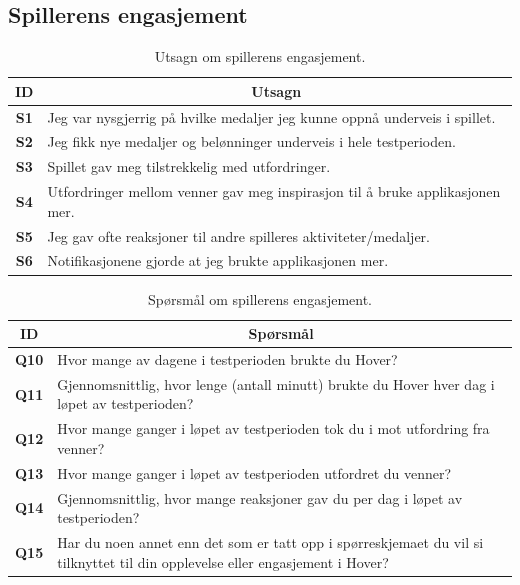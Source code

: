 \subsection*{Spillerens engasjement}
\begin{table}[H]
    \centering
    \begin{tabularx}{\textwidth}{|c|X|}
        \hline
        \textbf{ID} & \multicolumn{1}{c|}{\textbf{Utsagn}} \\ \hline
         \textbf{S1} & Jeg var nysgjerrig på hvilke medaljer jeg kunne oppnå underveis i spillet. \\ 
        \textbf{S2} & Jeg fikk nye medaljer og belønninger underveis i hele testperioden. \\ 
        \textbf{S3} & Spillet gav meg tilstrekkelig med utfordringer. \\ 
        \textbf{S4} & Utfordringer mellom venner gav meg inspirasjon til å bruke applikasjonen mer. \\ 
        \textbf{S5} & Jeg gav ofte reaksjoner til andre spilleres aktiviteter/medaljer. \\ 
        \textbf{S6} & Notifikasjonene gjorde at jeg brukte applikasjonen mer. \\
        \hline
    \end{tabularx}
    \caption{Utsagn om spillerens engasjement.}
    \label{tab:appendix_no_player_engagement_statements}
\end{table}

\begin{table}[H]
    \centering
    \begin{tabularx}{\textwidth}{|c|X|}
        \hline
        \textbf{ID} & \multicolumn{1}{c|}{\textbf{Spørsmål}} \\ \hline
        \textbf{Q10} & Hvor mange av dagene i testperioden brukte du Hover? \\
        \textbf{Q11} & Gjennomsnittlig, hvor lenge (antall minutt) brukte du Hover hver dag i løpet av testperioden? \\
        \textbf{Q12} & Hvor mange ganger i løpet av testperioden tok du i mot utfordring fra venner?  \\
        \textbf{Q13} & Hvor mange ganger i løpet av testperioden utfordret du venner? \\
        \textbf{Q14} & Gjennomsnittlig, hvor mange reaksjoner gav du per dag i løpet av testperioden? \\
        \textbf{Q15} & Har du noen annet enn det som er tatt opp i spørreskjemaet du vil si tilknyttet til din opplevelse eller engasjement i Hover? \\ \hline
    \end{tabularx}
    \caption{Spørsmål om spillerens engasjement.}
    \label{tab:appendix_no_player_engagement_questions}
\end{table}

